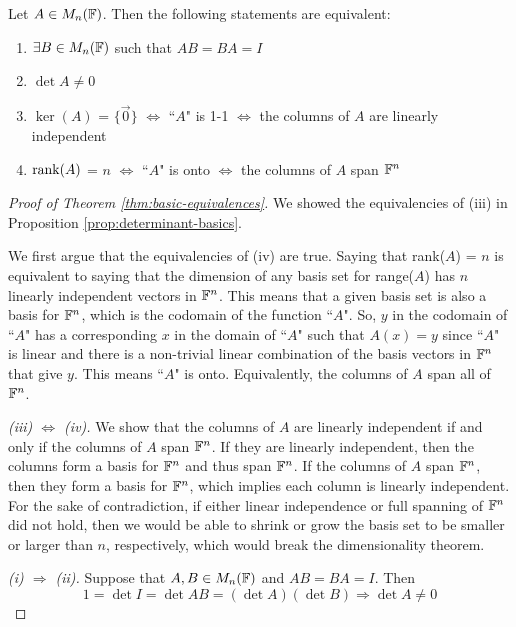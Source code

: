 \begin{theorem}
\label{thm:basic-equivalences}
Let $A \in M_n(\mathbb F)$. Then the following statements are equivalent:
\begin{enumerate}
    \item $\exists B \in M_n(\mathbb F)$ such that $AB = BA = I$
    \item $\det A \not= 0$
    \item $\ker(A)$ = $\{\vec{0}\}$ $\Longleftrightarrow$ ``$A$" is 1-1 $ \Longleftrightarrow$ the columns of $A$ are linearly independent
    \item $\operatorname{rank}(A)$ = $n$ $\Longleftrightarrow$ ``$A$" is onto $\Longleftrightarrow$ the columns of $A$ span $\mathbb F^n$
\end{enumerate}
\end{theorem}

\begin{proof}[Proof of Theorem \ref{thm:basic-equivalences}]
We showed the equivalencies of (iii) in Proposition \ref{prop:determinant-basics}.

We first argue that the equivalencies of (iv) are true. Saying that rank($A$) = $n$ is equivalent to saying that the dimension of any basis set for range($A$) has $n$ linearly independent vectors in $\mathbb F^n$. This means that a given basis set is also a basis for $\mathbb F^n$, which is the codomain of the function ``$A$". So, $y$ in the codomain of ``$A$" has a corresponding $x$ in the domain of ``$A$" such that $A(x) = y$ since ``$A$" is linear and there is a non-trivial linear combination of the basis vectors in $\mathbb F^n$ that give $y$. This means ``$A$" is onto. Equivalently, the columns of $A$ span all of $\mathbb F^n$.

\textit{(iii) $\Longleftrightarrow$ (iv).} We show that the columns of $A$ are linearly independent if and only if the columns of $A$ span $\mathbb F^n$. If they are linearly independent, then the columns form a basis for $\mathbb F^n$ and thus span $\mathbb F^n$. If the columns of $A$ span $\mathbb F^n$, then they form a basis for $\mathbb F^n$, which implies each column is linearly independent. For the sake of contradiction, if either linear independence or full spanning of $\mathbb F^n$ did not hold, then we would be able to shrink or grow the basis set to be smaller or larger than $n$, respectively, which would break the dimensionality theorem.

\textit{(i) $\Longrightarrow$ (ii).} Suppose that $A,B \in M_n(\mathbb F)$ and $AB = BA = I$. Then
$$
1 = \det I = \det AB = (\det A)(\det B) \Longrightarrow \det A \not= 0
$$


\end{proof}
